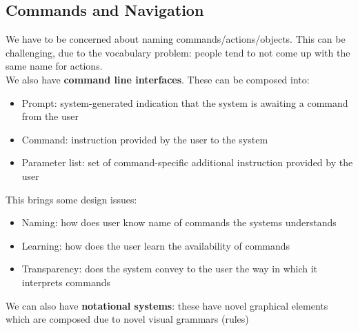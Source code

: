 \documentclass{article}
\begin{document}
\subsection{Commands and Navigation}
We have to be concerned about naming commands/actions/objects. This can be challenging, due to the vocabulary problem: people tend to not come up with the same name for actions. \\
We also have \textbf{command line interfaces}. These can be composed into:
\begin{itemize}
    \item Prompt: system-generated indication that the system is awaiting a command from the user
    \item Command: instruction provided by the user to the system
    \item Parameter list: set of command-specific additional instruction provided by the user
\end{itemize}
This brings some design issues:
\begin{itemize}
    \item Naming: how does user know name of commands the systems understands
    \item Learning: how does the user learn the availability of commands
    \item Transparency: does the system convey to the user the way in which it interprets commands
\end{itemize}
We can also have \textbf{notational systems}: these have novel graphical elements which are composed due to novel visual grammars (rules)
\end{document}
